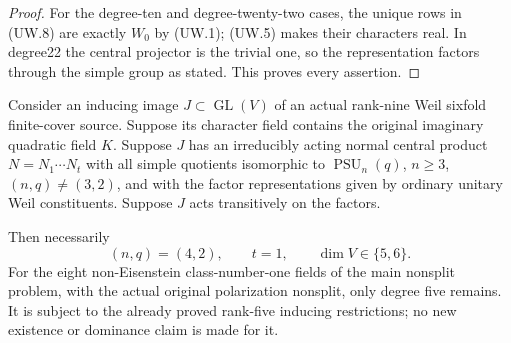 \begin{proof}
For the degree-ten and degree-twenty-two cases, the unique
rows in (UW.8) are exactly $W_0$ by (UW.1); (UW.5) makes
their characters real. In degree22 the central projector
is the trivial one, so the representation factors through
the simple group as stated. This proves every assertion.
\end{proof}

\begin{theorem}
\label{D-BI-24}
Consider an inducing image $J\subset\operatorname{GL}(V)$
of an actual rank-nine Weil sixfold finite-cover source.
Suppose its character field contains the original imaginary
quadratic field $K$. Suppose $J$ has an irreducibly acting
normal central product $N=N_1\cdots N_t$ with all simple
quotients isomorphic to $\operatorname{PSU}_n(q)$,
$n\ge3$, $(n,q)\ne(3,2)$, and with the factor representations
given by ordinary unitary Weil constituents. Suppose $J$
acts transitively on the factors.

Then necessarily
\[
                   (n,q)=(4,2),\qquad t=1,\qquad
                   \dim V\in\{5,6\}.                       \tag{UW.10}
\]
For the eight non-Eisenstein class-number-one fields of the
main nonsplit problem, with the actual original polarization
nonsplit, only degree five remains. It is subject to the
already proved rank-five inducing restrictions; no new
existence or dominance claim is made for it.
\end{theorem}

